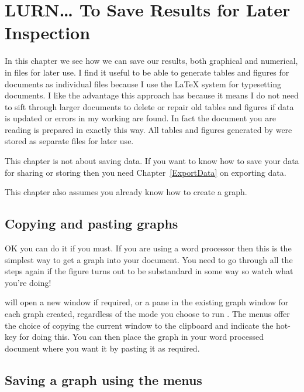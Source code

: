

 
\chapter{LURN\ldots{} To Save Results for Later Inspection} 
\label{StoreResults} 
 



 
In this chapter we see how we can save our results, both graphical and numerical, in files for later use. I find it useful to be able to generate tables and figures for documents as individual files because I use the \LaTeX{} system for typesetting documents. I like the advantage this approach has because it means I do not need to sift through larger documents to delete or repair old tables and figures if data is updated or errors in my working are found. In fact the document you are reading is prepared in exactly this way. All tables and figures generated by \R{} were stored as separate files for later use. 
 
This chapter is not about saving data. If you want to know how to save your data for sharing or storing then you need Chapter~\ref{ExportData} on exporting data. 
 
This chapter also assumes you already know how to create a graph. 
 
\section{Copying and pasting graphs} 
 
OK you can do it if you must. If you are using a word processor then this is the simplest way to get a graph into your document. You need to go through all the steps again if the figure turns out to be substandard in some way so watch what you're doing! 
 
\R{} will open a new window if required, or a pane in the existing graph window for each graph created, regardless of the mode you choose to run \R{}. The menus offer the choice of copying the current window to the clipboard and indicate the hot-key for doing this. You can then place the graph in your word processed document where you want it by pasting it as required. 
 
\section{Saving a graph using the menus} 
 
